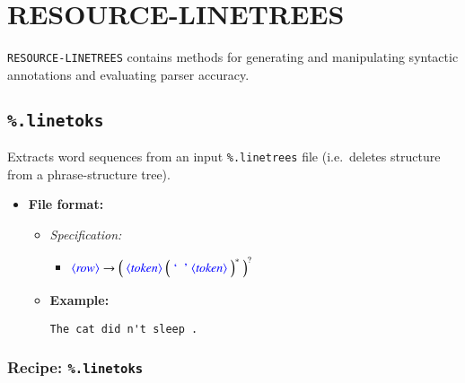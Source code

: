 \documentclass[12pt]{report}
\def\blue{\color{blue}}
\def\magenta{\color{magenta}}
\begin{document}
\chapter{RESOURCE-LINETREES}
\renewcommand{\labelitemi}{}
\renewcommand{\labelitemii}{}
\renewcommand{\labelitemiii}{}
\renewcommand{\labelitemiv}{}

{\tt RESOURCE-LINETREES} contains methods for generating and manipulating syntactic annotations and evaluating parser accuracy.

\section{\blue\tt \%.linetoks}

Extracts word sequences from an input {\blue\tt \%.linetrees} file (i.e.\ deletes structure from a phrase-structure tree).

\begin{itemize}
\item\textbf{File format:}
\begin{itemize}
\item\textit{Specification:}

\begin{itemize}
\item $\dtype{row} \rightarrow \Big( \ \dtype{token} \ \Big( \ \dcode{\ } \ \dtype{token} \ \Big)^* \ \Big)^?$
\end{itemize}

\item\textbf{Example:}

{\magenta\begin{verbatim}
The cat did n't sleep .
\end{verbatim}
}
\end{itemize}
\end{itemize}

\subsection{Recipe: {\blue\tt \%.linetoks}}
\end{document}
